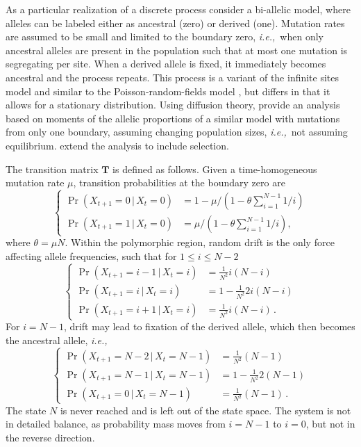 \documentclass[preprint]{elsarticle}
\newcommand\given{{\,|\,}}
\newcommand\ie{{\it i.e.,}}
\newcommand\x[1]{\ensuremath{X_{#1}}}
\begin{document}
As a particular realization of a discrete process consider a bi-allelic model, where alleles can be labeled either as ancestral (zero) or derived (one). Mutation rates are assumed to be small and limited to the boundary zero, \ie\ when only ancestral alleles are present in the population such that at most one mutation is segregating per site. When a derived allele is fixed, it immediately becomes ancestral and the process repeats. This process is a variant of the infinite sites model \citep{Kimu69} and similar to the Poisson-random-fields model \citep{Sawy92}, but differs in that it allows for a stationary distribution. Using diffusion theory, \citet{Evan07} provide an analysis based on moments of the allelic proportions of a similar model with mutations from only one boundary, assuming changing population sizes, \ie\ not assuming equilibrium. \citet{Zivk15} extend the analysis to include selection. 

The transition matrix $\mathbf{T}$ is defined as follows. Given a time-homogeneous mutation rate $\mu$, transition probabilities at the boundary zero are
\begin{equation}\label{eq:boundary_mutation}
\begin{cases}
\Pr(\x{t+1}=0\given \x{t}=0)&=1-\mu/(1-\theta\sum_{i=1}^{N-1}1/i)\\
\Pr(\x{t+1}=1\given \x{t}=0)&=\mu/(1-\theta\sum_{i=1}^{N-1}1/i),
\end{cases}
\end{equation}
where $\theta=\mu N$. Within the polymorphic region, random drift is the only force affecting allele frequencies, such that for $1\leq i \leq N-2$
\begin{equation}
\begin{cases}
\Pr(\x{t+1}=i-1\given \x{t}=i) &=\frac1{N^2} i(N-i)\\
\Pr(\x{t+1}=i\given \x{t}=i)   &=1-\frac1{N^2} 2i(N-i)\\
\Pr(\x{t+1}=i+1\given \x{t}=i) &=\frac1{N^2} i(N-i)\,.
\end{cases}
\end{equation}
For $i=N-1$, drift may lead to fixation of the derived allele, which then becomes the ancestral allele, \ie\
\begin{equation}
\begin{cases}
\Pr(\x{t+1}=N-2\given \x{t}=N-1) &=\frac1{N^2} (N-1)\\
\Pr(\x{t+1}=N-1\given \x{t}=N-1) &=1-\frac1{N^2} 2(N-1)\\
\Pr(\x{t+1}=0\given \x{t}=N-1)   &=\frac1{N^2} (N-1)\,.
\end{cases}
\end{equation}
The state $N$ is never reached and is left out of the state space. The system is not in detailed balance, as probability mass moves from $i=N-1$ to $i=0$, but not in the reverse direction.
\end{document}
